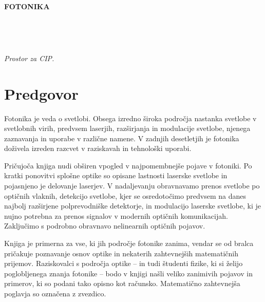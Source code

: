 \documentclass[a4paper,10pt,fleqn]{book}
\begin{document}

\strut
\vfill
\thispagestyle{empty}
\centerline{\textbf{FOTONIKA}}


\lihastran~
\thispagestyle{empty}
\vfill\vfill
{}
\vfill
{}
\vfill\vfill\vfill
\vfill
{}


\sodastran~
\thispagestyle{empty}

\vfill
\begin{CIP}
   \emph{Prostor za CIP.}
\end{CIP}


\lihastran
\thispagestyle{plain}

\chapter*{Predgovor}
Fotonika je veda o svetlobi. Obsega izredno široka področja nastanka svetlobe
v svetlobnih virih, predvsem laserjih, razširjanja in modulacije svetlobe,
njenega zaznavanja in uporabe v različne namene. V zadnjih 
desetletjih je fotonika doživela izreden razcvet v raziskavah in 
tehnološki uporabi.

Pričujoča knjiga nudi obširen vpogled v najpomembnejše pojave v fotoniki.
Po kratki ponovitvi splošne optike so opisane lastnosti laserske svetlobe
in pojasnjeno je delovanje laserjev. V nadaljevanju obravnavamo prenos
svetlobe po optičnih vlaknih, detekcijo svetlobe, kjer se osredotočimo 
predvsem na danes najbolj razširjene polprevodniške detektorje, in 
modulacijo laserske svetlobe, ki je nujno potrebna za prenos signalov
v modernih optičnih komunikacijah. Zaključimo s podrobno obravnavo 
nelinearnih optičnih pojavov. 

Knjiga je primerna za vse, ki jih področje fotonike zanima, 
vendar se od bralca pričakuje poznavanje osnov optike in nekaterih 
zahtevnejših matematičnih prijemov. Raziskovalci s področja optike 
-- in tudi študenti fizike, ki si želijo poglobljenega znanja fotonike -- 
bodo v knjigi našli veliko zanimivih pojavov in primerov, ki so podani 
tako opisno kot računsko. Matematično zahtevnejša poglavja so označena 
z zvezdico.
\end{document}
